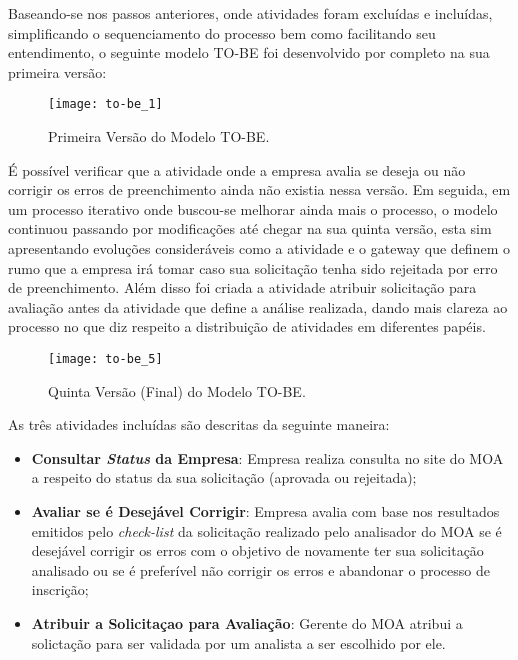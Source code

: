 Baseando-se nos passos anteriores, onde atividades foram excluídas e incluídas, simplificando o sequenciamento do processo bem como facilitando seu entendimento, o seguinte modelo TO-BE foi desenvolvido por completo na sua primeira versão:
\begin{figure}[H]
	\centering
	\texttt{[image: to-be\_1]}
	\label{fig:tobeversaoum}
	\caption[Primeira Versão do Modelo TO-BE]{Primeira Versão do Modelo TO-BE.}
\end{figure}
É possível verificar que a atividade onde a empresa avalia se deseja ou não corrigir os erros de preenchimento ainda não existia nessa versão. Em seguida, em um processo iterativo onde buscou-se melhorar ainda mais o processo, o modelo continuou passando por modificações até chegar na sua quinta versão, esta sim apresentando evoluções consideráveis como a atividade e o gateway que definem o rumo que a empresa irá tomar caso sua solicitação tenha sido rejeitada por erro de preenchimento. Além disso foi criada a atividade atribuir solicitação para avaliação antes da atividade que define a análise realizada, dando mais clareza ao processo no que diz respeito a distribuição de atividades em diferentes papéis.
\begin{figure}[H]
	\centering
	\texttt{[image: to-be\_5]}
	\label{fig:tobeversaofinal}
	\caption[Quinta Versão (Final) do Modelo TO-BE]{Quinta Versão (Final) do Modelo TO-BE.}
\end{figure}
As três atividades incluídas são descritas da seguinte maneira:
\begin{itemize}
	\item{\textbf{Consultar \emph{Status} da Empresa}: Empresa realiza consulta no site do MOA a respeito do status da sua solicitação (aprovada ou rejeitada);}
	\item{\textbf{Avaliar se é Desejável Corrigir}: Empresa avalia com base nos resultados emitidos pelo \emph{check-list} da solicitação realizado pelo analisador do MOA se é desejável corrigir os erros com o objetivo de novamente ter sua solicitação analisado ou se é preferível não corrigir os erros e abandonar o processo de inscrição;}
	\item{\textbf{Atribuir a Solicitaçao para Avaliação}: Gerente do MOA atribui a solictação para ser validada por um analista a ser escolhido por ele.}
\end{itemize}